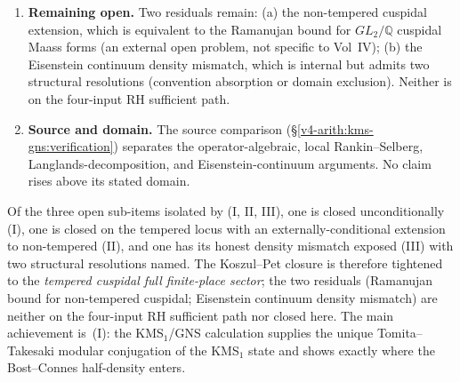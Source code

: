 \begin{enumerate}
\item \textbf{Remaining open.} Two residuals remain: (a) the
non-tempered cuspidal extension, which is equivalent to the
Ramanujan bound for \(GL_{2}/\mathbb{Q}\) cuspidal Maass forms (an
external open problem, not specific to Vol~IV); (b) the Eisenstein
continuum density mismatch, which is internal but admits two
structural resolutions (convention absorption or domain exclusion).
Neither is on the four-input RH sufficient path.

\item \textbf{Source and domain.} The source comparison
(\S\ref{v4-arith:kms-gns:verification}) separates the
operator-algebraic, local Rankin--Selberg, Langlands-decomposition,
and Eisenstein-continuum arguments. No claim rises above its stated
domain.
\end{enumerate}

Of the three open sub-items isolated by
 (I, II, III), one is closed
unconditionally (I), one is closed on the tempered locus with an
externally-conditional extension to non-tempered (II), and one has
its honest density mismatch exposed (III) with two structural
resolutions named. The Koszul--Pet closure is therefore tightened
to the \emph{tempered cuspidal full finite-place sector}; the two
residuals (Ramanujan bound for non-tempered cuspidal; Eisenstein
continuum density mismatch) are neither on the four-input RH
sufficient path nor closed here. The main achievement is~(I): the
KMS\({}_{1}\)/GNS calculation supplies the unique Tomita--Takesaki
modular conjugation of the KMS\({}_{1}\) state and shows exactly where
the Bost--Connes half-density enters.
